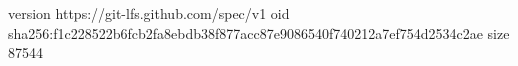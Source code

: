 version https://git-lfs.github.com/spec/v1
oid sha256:f1c228522b6fcb2fa8ebdb38f877acc87e9086540f740212a7ef754d2534c2ae
size 87544
